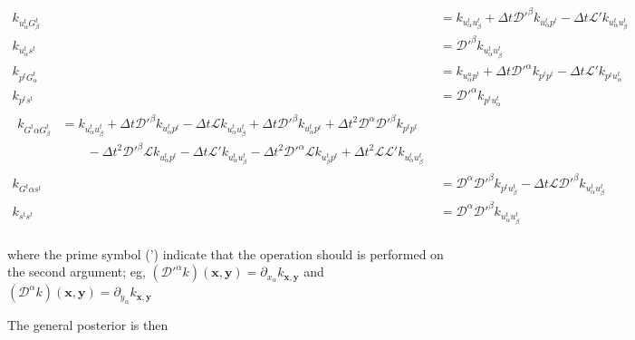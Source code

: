 \documentclass[11pt, a4paper]{report}
\begin{document}
\begin{align}
k_{u^{t}_\alpha G^{t}_\beta} &= k_{u^{t}_\alpha u^{t}_\beta} + \Delta t \mathcal{D}'^\beta k_{u^{t}_\alpha p^{t}} - \Delta t \mathcal{L}' k_{u^{t}_\alpha u^{t}_\beta} \\
k_{u^{t}_\alpha s^{t}} &= \mathcal{D}'^\beta k_{u^{t}_\alpha u^{t}_\beta} \\
k_{p^{t} G^{t}_\alpha} &= k_{u^{u}_\alpha p^{t}} + \Delta t \mathcal{D}'^\alpha k_{p^{t}p^{t}} - \Delta t \mathcal{L}' k_{p^{t} u^{t}_\alpha} \\
k_{p^{t}s^{t}} &= \mathcal{D}'^\alpha k_{p^{t} u^{t}_\alpha} \\
\begin{split}
k_{G^{t}\alpha G^{t}_\beta} &= k_{u^{t}_\alpha u^{t}_\beta}
 + {\Delta t} \mathcal{D}'^\beta k_{u^{t}_\alpha p^{t}}
 - {\Delta t} \mathcal{L} k_{u^{t}_\alpha u^{t}_\beta}
 + {\Delta t} \mathcal{D}'^\beta k_{u^{t}_\alpha p^{t}}
 + {\Delta t}^2 \mathcal{D}^\alpha \mathcal{D}'^\beta k_{p^{t}p^{t}} \\
&\qquad - {\Delta t}^2 \mathcal{D}'^\beta \mathcal{L} k_{u^{t}_\alpha p^{t}}
 - {\Delta t} \mathcal{L}' k_{u^{t}_\alpha u^{t}_\beta}
 - {\Delta t}^2 \mathcal{D}'^\alpha \mathcal{L} k_{u^{t}_\beta p^{t}}
 + {\Delta t}^2 \mathcal{L} \mathcal{L}' k_{u^{t}_\alpha u^{t}_\beta} 
\end{split} \\
k_{G^{t}\alpha s^{t}} &= \mathcal{D}^\alpha \mathcal{D}'^\beta k_{p^{t} u^{t}_\beta}
 - \Delta t  \mathcal{L} \mathcal{D}'^\beta k_{u^{t}_\alpha u^{t}_\beta} \\
k_{s^{t}s^{t}} &= \mathcal{D}^\alpha \mathcal{D}'^\beta k_{u^{t}_\alpha u^{t}_\beta} \\
\end{align}

\noindent where the prime symbol (') indicate that the operation should is performed on the second argument; 
eg, \((\mathcal{D}'^{\alpha}k)({\boldsymbol{x}, \boldsymbol{y}}) = \partial_{x_\alpha} k_{\boldsymbol{x}, \boldsymbol{y}}\)
and \((\mathcal{D}^{\alpha}k)({\boldsymbol{x}, \boldsymbol{y}}) = \partial_{y_\alpha} k_{\boldsymbol{x}, \boldsymbol{y}}\)

The general posterior is then
\end{document}

